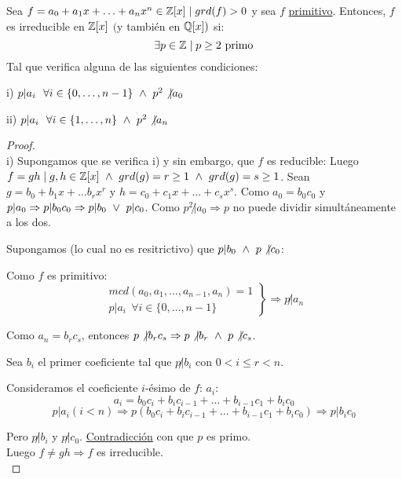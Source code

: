 
\begin{prop}
    Sea $f = a_0+a_1x + \ldots + a_nx^n \in \mathbb Z[x] \mid grd(f)>0$ y sea $f$ \underline{primitivo}.\newline
    Entonces, $f$ es irreducible en $\mathbb Z[x]$ $($y también en $\mathbb Q[x])$ si:
    $$\exists p \in \mathbb Z \mid p\geq 2 \mbox{ primo}$$
    Tal que verifica alguna de las siguientes condiciones:\par
    i) $p|a_i~~\forall i \in \{0, \ldots, n-1\} \ \land \  p^2\not|a_0$\par
    ii) $p|a_i~~\forall i \in \{1, \ldots, n\} \ \land \  p^2\not|a_n$
\begin{proof}
    \ \\
    i) Supongamos que se verifica i) y sin embargo, que $f$ es reducible:\newline
    Luego $f=gh \mid g,h \in \mathbb Z[x] \ \land \  grd(g)=r\geq 1 \ \land \  grd(g)=s\geq 1$.\newline
    Sean $g=b_0+b_1x+\ldots b_rx^r$ y $h=c_0+c_1x + \ldots + c_sx^s$.\newline
    Como $a_0=b_0c_0$ y $p|a_0 \Rightarrow p|b_0c_0 \Rightarrow p|b_0 \ \lor \  p|c_0$.\newline
    Como $p^2\not|a_0 \Rightarrow p$ no puede dividir simultáneamente a los dos.\par
    Supongamos (lo cual no es resitrictivo) que $p|b_0 \ \land \  p\not|c_0$:\par
    Como $f$ es primitivo:
    $$\left. \begin{array}{l}
            mcd(a_0,a_1, \ldots, a_{n-1}, a_n)=1 \\
            p|a_i~~\forall i \in \{0,\ldots, n-1\}
        \end{array} \right\} \Rightarrow p\not| a_n$$

    Como $a_n=b_rc_s$, entonces $p\not|b_rc_s \Rightarrow p\not|b_r \ \land \  p\not|c_s$.\par
    Sea $b_i$ el primer coeficiente tal que $p\not|b_i$ con $0<i\leq r<n$.\par
    Consideramos el coeficiente $i$-ésimo de $f$: $a_i$:
    $$a_i=b_0c_i + b_ic_{i-1} + \ldots + b_{i-1}c_1 + b_ic_0$$
    $$p|a_i (i<n) \Rightarrow p(b_0c_i + b_ic_{i-1} + \ldots + b_{i-1}c_1 + b_ic_0) \Rightarrow p|b_ic_0$$

    Pero $p\not|b_i$ y $p\not|c_0$. \underline{Contradicción} con que $p$ es primo.\\

    
    Luego $f\neq gh \Rightarrow f$ es irreducible.\\

    
\end{proof}
\end{prop}


